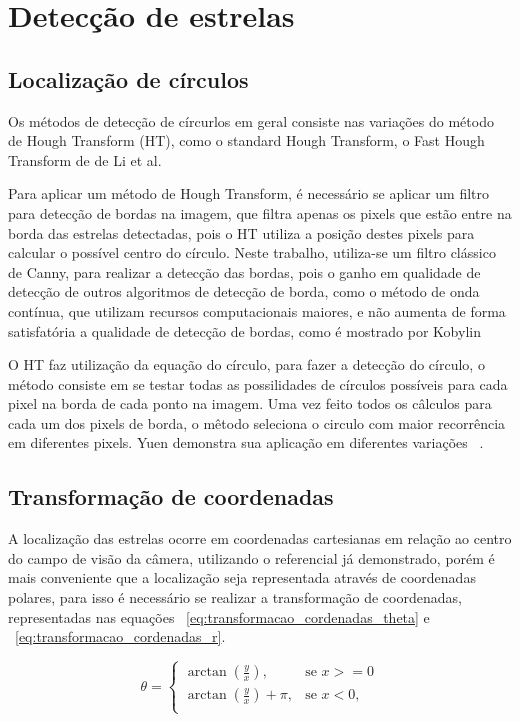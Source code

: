 \section{Detecção de estrelas}
\subsection{Localização de círculos}

Os métodos de detecção de círcurlos em geral consiste nas variações do método de Hough Transform (HT), como o standard Hough Transform, 
o Fast Hough Transform de de Li et al.

Para aplicar um método de Hough Transform, é necessário se aplicar um filtro para detecção de bordas na imagem, 
que filtra apenas os pixels que estão entre na borda das estrelas detectadas, 
pois o HT utiliza a posição destes pixels para calcular o possível centro do círculo.
Neste trabalho, utiliza-se um filtro clássico de Canny, para realizar a detecção das bordas, 
pois o ganho em qualidade de detecção de outros algoritmos de detecção de borda, como o método de onda contínua, 
que utilizam recursos computacionais maiores, e não aumenta de forma satisfatória a qualidade de detecção de bordas, 
como é mostrado por Kobylin ~\cite[]{kobylin2014comparison}

O HT faz utilização da equação do círculo, para fazer a detecção do círculo, o método consiste em se testar todas as possilidades de círculos possíveis para cada pixel na borda de cada ponto na imagem.
Uma vez feito todos os câlculos para cada um dos pixels de borda, o mêtodo seleciona o circulo com maior recorrência em diferentes pixels. Yuen demonstra sua aplicação em diferentes variações ~\cite[]{YUEN199071}.

\subsection{Transformação de coordenadas}

A localização das estrelas ocorre em coordenadas cartesianas em relação ao centro do campo de visão da câmera, 
utilizando o referencial já demonstrado, porém é mais conveniente que a localização seja representada através de coordenadas polares, 
para isso é necessário se realizar a transformação de coordenadas,
representadas nas equações ~\ref{eq:transformacao_cordenadas_theta} e ~\ref{eq:transformacao_cordenadas_r}.

\begin{equation}
	\theta  = 
	\begin{cases}
		\arctan \left( \frac{y}{x} \right), & \text{se } x >= 0 \\
		\arctan \left( \frac{y}{x} \right) + \pi, & \text{se } x < 0, \\
	\end{cases}
	\label{eq:transformacao_cordenadas_theta}
\end{equation}

